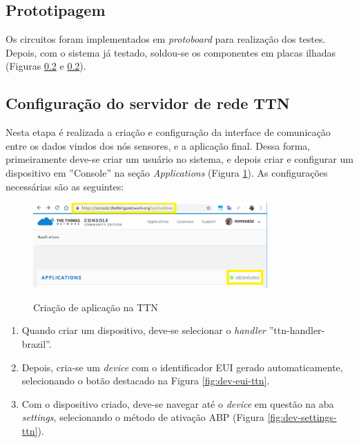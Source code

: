 \documentclass[oneside,openright,12pt]{ufsm_2015} %
\begin{document}
    \subsection{Prototipagem}
    Os circuitos foram implementados em \textit{protoboard} para realização dos testes. Depois, com o sistema já testado, soldou-se os componentes em placas ilhadas (Figuras \ref{} e \ref{}).
    
    \subsection{Configuração do servidor de rede TTN}
    Nesta etapa é realizada a criação e configuração da interface de comunicação entre os dados vindos dos nós sensores, e a aplicação final. Dessa forma, primeiramente deve-se criar um usuário no sistema, e depois criar e configurar um dispositivo em ''Console'' na seção \textit{Applications} (Figura \ref{fig:add-app-ttn}). As configurações necessárias são as seguintes: 
    
    \begin{figure}[ht]
 	    \caption{\label{exepretex} Criação de aplicação na TTN}
        \centering
        \includegraphics[width=0.8\textwidth]{figuras/teste.png}
        \vspace{\baselineskip} %
        \label{fig:add-app-ttn}
    \end{figure}
    
    \begin{enumerate}
        \item Quando criar um dispositivo, deve-se selecionar o \textit{handler} ''ttn-handler-brazil''.
        \item Depois, cria-se um \textit{device} com o identificador EUI gerado automaticamente, selecionando o botão destacado na Figura \ref{fig:dev-eui-ttn}.
        \item Com o dispositivo criado, deve-se navegar até o \textit{device} em questão na aba \textit{settings}, selecionando o método de ativação ABP (Figura \ref{fig:dev-settings-ttn}).
    \end{enumerate}
    
\end{document}
